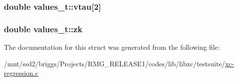 \hypertarget{structvalues__t_ab569f92befb05fae02665bd6bc735617}{
\subsubsection[{vtau}]{\setlength{\rightskip}{0pt plus 5cm}double values\-\_\-t\-::vtau\mbox{[}2\mbox{]}}}\label{structvalues__t_ab569f92befb05fae02665bd6bc735617}
\hypertarget{structvalues__t_a94c4faad7a251425af5ad3f10d887e5d}{
\subsubsection[{zk}]{\setlength{\rightskip}{0pt plus 5cm}double values\-\_\-t\-::zk}}\label{structvalues__t_a94c4faad7a251425af5ad3f10d887e5d}


The documentation for this struct was generated from the following file\-:\begin{DoxyCompactItemize}
\item 
/mnt/ssd2/briggs/\-Projects/\-R\-M\-G\-\_\-\-R\-E\-L\-E\-A\-S\-E1/codes/lib/libxc/testsuite/\hyperlink{xc-regression_8c}{xc-\/regression.\-c}\end{DoxyCompactItemize}

